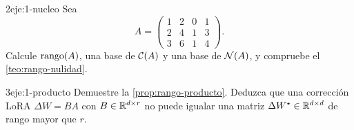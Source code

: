 \begin{ejercicio}{2}{eje:1-nucleo}
Sea
\[
A=\begin{pmatrix}1&2&0&1\\2&4&1&3\\3&6&1&4\end{pmatrix}.
\]
Calcule $\operatorname{rango}(A)$, una base de $\mathcal{C}(A)$ y una base de $\mathcal{N}(A)$, y compruebe el \cref{teo:rango-nulidad}.
\end{ejercicio}

\begin{ejercicio}{3}{eje:1-producto}
Demuestre la \cref{prop:rango-producto}. Deduzca que una corrección LoRA $\Delta W=BA$ con $B\in\mathbb{R}^{d\times r}$ no puede igualar una matriz $\Delta W^{\star}\in\mathbb{R}^{d\times d}$ de rango mayor que $r$.
\end{ejercicio}
